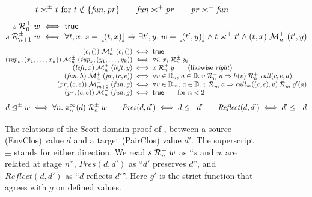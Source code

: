 \begin{figure}[h]
\small\figdefs
{}
\[
  t \mathrel{\asymp^{\pm}} t \text{ for } t \notin \{\mathit{fun}, \mathit{pr}\}
  \qquad
  \mathit{fun} \mathrel{\asymp^{+}} \mathit{pr}
  \qquad
  \mathit{pr} \mathrel{\asymp^{-}} \mathit{fun}
\]
\[
\begin{array}{@{}r@{\;}c@{\;}l@{}}
  s \SR{\pm}{0} w & \iff & \mathsf{true}\\
  s \SR{\pm}{n+1} w & \iff &
    \forall t, x.\; s = \up{(t, x)} \Rightarrow
    \exists t', y.\; w = \up{(t', y)} \land t \SameTag{\pm} t'
    \land (t, x) \mathrel{\mathcal{M}^{\pm}_n} (t', y)
\end{array}
\]
\[
\begin{array}{@{}r@{\;}c@{\;}l@{}}
  (c, ()) \mathrel{\mathcal{M}^{\pm}_n} (c, ()) & \iff & \mathsf{true}\\
  (\mathit{tup}_k, (x_1, \ldots, x_k)) \mathrel{\mathcal{M}^{\pm}_n} (\mathit{tup}_k, (y_1, \ldots, y_k))
    & \iff & \forall i.\; x_i \SR{\pm}{n} y_i\\
  (\mathit{left}, x) \mathrel{\mathcal{M}^{\pm}_n} (\mathit{left}, y)
    & \iff & x \SR{\pm}{n} y
    \qquad \text{(likewise $\mathit{right}$)}\\
  (\mathit{fun}, h) \mathrel{\mathcal{M}^{+}_n} (\mathit{pr}, (c, e))
    & \iff & \forall v \in \mathbb{D}_n,\, a \in \mathbb{D}.\;
      v \SR{+}{n} a \Rightarrow h(v) \SR{+}{n} \mathit{call}(c, e, a)\\
  (\mathit{pr}, (c, e)) \mathrel{\mathcal{M}^{-}_{m+2}} (\mathit{fun}, g)
    & \iff & \forall v \in \mathbb{D}_m,\, a \in \mathbb{D}.\;
      v \SR{-}{m} a \Rightarrow \mathit{call}_m((c, e), v) \SR{-}{m} g'(a)\\
  (\mathit{pr}, (c, e)) \mathrel{\mathcal{M}^{-}_n} (\mathit{fun}, g)
    & \iff & \mathsf{true} \qquad \text{for } n < 2
\end{array}
\]
\[
  d \mathrel{\trianglelefteq^{\pm}} w \iff \forall n.\; \pi^\infty_n(d) \mathrel{\mathcal{R}^{\pm}_{n}} w
  \qquad
  \mathit{Pres}(d, d') \iff d \mathrel{\trianglelefteq^{+}} d'
  \qquad
  \mathit{Reflect}(d, d') \iff d' \mathrel{\trianglelefteq^{-}} d
\]
\caption{The relations of the Scott-domain proof of ,
  between a source (EnvClos) value $d$ and a target (PairClos) value
  $d'$. The superscript $\pm$ stands for either direction. We read
  $s \mathrel{\mathcal{R}^{\pm}_{n}} w$ as ``$s$ and $w$ are related at stage $n$'',
  $\mathit{Pres}(d, d')$ as ``$d'$ preserves $d$'', and
  $\mathit{Reflect}(d, d')$ as ``$d$ reflects $d'$''. Here $g'$ is
  the strict function that agrees with $g$ on defined values.}
\label{fig:scott-delay}
\end{figure}

